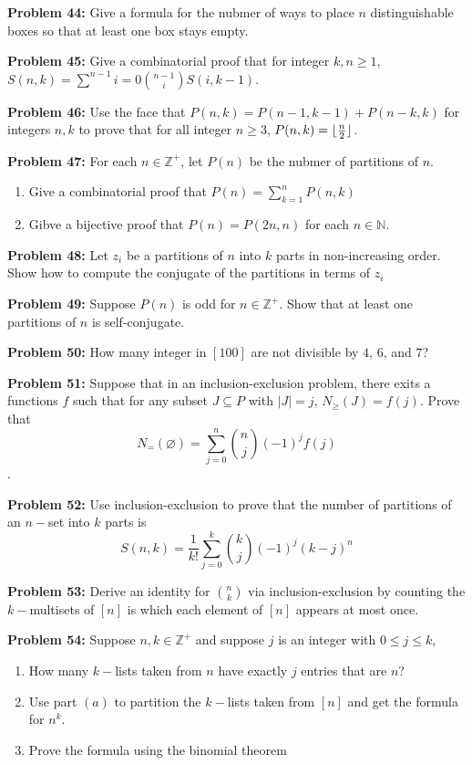 \documentclass[12pt]{article}
\newcommand{\Z}{\mathbb{Z}}
\newcommand{\prob}[1]{\textbf{Problem #1:}}
\DeclarePairedDelimiter{\floor}{\lfloor}{\rfloor} %
\begin{document}
\prob{44} Give a formula for the nubmer of ways to place $n$ distinguishable boxes so that at least one box stays empty.

\prob{45} Give a combinatorial proof that for integer $k,n \geq 1$, $S(n,k) = \sum\limits^{n-1}{i=0} \binom{n-1}{i} S(i, k-1)$. 

\prob{46} Use the face that $P(n,k) = P(n-1, k-1) + P(n-k, k)$ for integers $n, k$ to prove that for all integer $n \geq 3$, $P(n,k) = \floor{\frac{n}{2}}$. 

\prob{47} For each $n \in \Z^+$, let $P(n)$ be the nubmer of partitions of $n$. 
    \begin{enumerate}[label=(\alph*)]
        \item Give a combinatorial proof that $P(n) = \sum\limits^n_{k=1} P(n,k)$
        \item Gibve a bijective proof that $P(n) = P(2n, n)$ for each $n \in \mathbb{N}$.
    \end{enumerate}

\prob{48} Let $z_i$ be a partitions of $n$ into $k$ parts in non-increasing order. Show how to compute the conjugate of the partitions in terms of $z_i$

\prob{49} Suppose $P(n)$ is odd for $n \in \Z^+$. Show that at least one partitions of $n$ is self-conjugate. 

\prob{50} How many integer in $[100]$ are not divisible by $4$, $6$, and $7$?

\prob{51} Suppose that in an inclusion-exclusion problem, there exits a functions $f$ such that for any subset $J \subseteq P$ with $|J| = j$, $N_{\geq} (J) = f(j)$. Prove that $$N_{=} (\varnothing) = \sum\limits^n_{j=0} \binom{n}{j} (-1)^j f(j)$$. 

\prob{52} Use inclusion-exclusion to prove that the number of partitions of an $n-$set into $k$ parts is $$S(n,k) = \frac{1}{k!} \sum\limits^k_{j=0} \binom{k}{j} (-1)^j (k-j)^n$$

\prob{53} Derive an identity for $\binom{n}{k}$ via inclusion-exclusion by counting the $k-$multisets of $[n]$ is which each element of $[n]$ appears at most once. 

\prob{54} Suppose $n,k \in \Z^+$ and suppose $j$ is an integer with $0 \le j \le k$,
\begin{enumerate}[label=(\alph*)]
    \item How many $k-$lists taken from $n$ have exactly $j$ entries that are $n$?
    \item Use part $(a)$ to partition the $k-$lists taken from $[n]$ and get the formula for $n^k$.
    \item Prove the formula using the binomial theorem
\end{enumerate}
\end{document}
